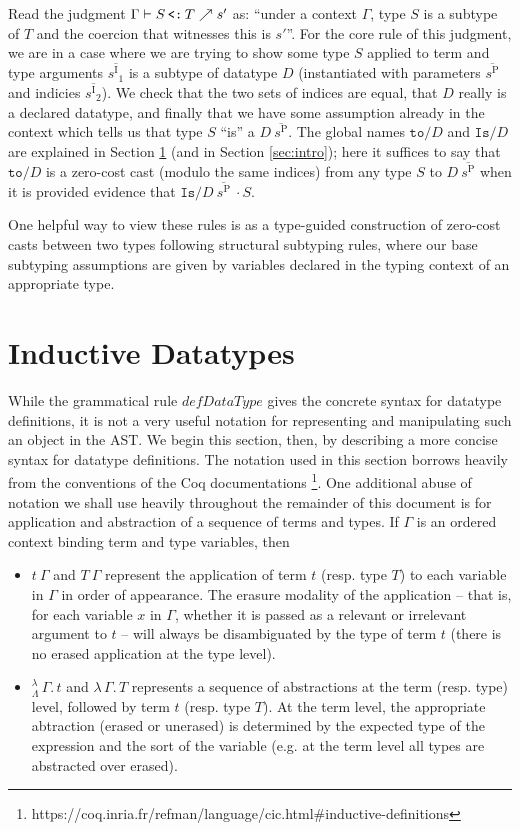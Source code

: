 \documentclass{article}
\newcommand{\absu}[3]{{#1}\, #2.\, #3}
\newcommand{\splab}[1]{\ensuremath{^{\text{#1}}}}
\newcommand{\elales}{\ensuremath{\nearrow}}
\newcommand{\vars}[1]{{\overline{#1}}}
\newcommand{\lamLam}{^{\lambda}_{\Lambda}}
\newcommand{\les}{\texttt{\,<:\,}}
\begin{document}
Read the judgment \(\Gamma \vdash S \les T \elales s'\) as: ``under a context
$\Gamma$, type $S$ is a subtype of $T$ and the coercion that witnesses this is
$s'$''. For the core rule of this judgment, we are in a case where we are trying
to show some type $S$ applied to term and type arguments $\vars{s\splab{I}_1}$
is a subtype of datatype $D$ (instantiated with parameters $\vars{s\splab{P}}$
and indicies $\vars{s\splab{I}_2}$). We check that the two sets of indices are
equal, that $D$ really is a declared datatype, and finally that we have some
assumption already in the context which tells us that type $S$ ``is'' a $D\
\vars{s\splab{P}}$. The global names $\texttt{to/}D$ and $\texttt{Is/}D$ are
explained in Section \ref{sec:ind-data} (and in Section \ref{sec:intro}); here
it suffices to say that $\texttt{to/}D$ is a zero-cost cast (modulo the same
indices) from any type $S$ to $D\ \vars{s\splab{P}}$ when it is provided
evidence that \(\texttt{Is/}D\ \vars{s\splab{P}}\ ·S\).

One helpful way to view these rules is as a type-guided construction of
zero-cost casts between two types following structural subtyping rules, where
our base subtyping assumptions are given by variables declared in the typing
context of an appropriate type.

\newpage
\section{Inductive Datatypes}
\label{sec:ind-data}

While the grammatical rule $defDataType$ gives the concrete syntax for datatype
definitions, it is not a very useful notation for representing and manipulating
such an object in the AST. We begin this section, then, by describing a more
concise syntax for datatype definitions. The notation used in this section
borrows heavily from the conventions of the Coq documentations
\footnote{https://coq.inria.fr/refman/language/cic.html\#inductive-definitions}.
One additional abuse of notation we shall use heavily throughout the remainder
of this document is for application and abstraction of a sequence of terms and
types. If $\Gamma$ is an ordered context binding term and type variables, then

\begin{itemize}
\item $t\ \Gamma$ and $T\ \Gamma$ represent the application of term $t$ (resp.
  type $T$) to each variable in $\Gamma$ in order of appearance. The erasure
  modality of the application -- that is, for each variable $x$ in $\Gamma$,
  whether it is passed as a relevant or irrelevant argument to $t$ -- will
  always be disambiguated by the type of term $t$ (there is no erased
  application at the type level).
\item $\absu{\lamLam}{\Gamma}{t}$ and $\absu{\lambda}{\Gamma}{T}$ represents a
  sequence of abstractions at the term (resp. type) level, followed by term $t$
  (resp. type $T$). At the term level, the appropriate abtraction (erased or
  unerased) is determined by the expected type of the expression and the sort
  of the variable (e.g. at the term level all types are abstracted over erased).
\end{itemize}
\end{document}
